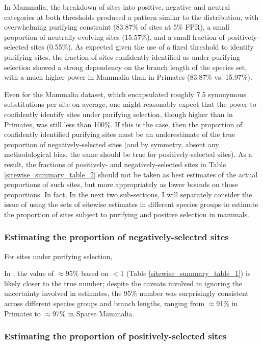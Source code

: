 In Mammalia, the breakdown of sites into positive, negative and
neutral categories at both \fpr thresholds produced a pattern similar
to the \omgml distribution, with overwhelming purifying constraint
(83.87\% of sites at 5\% FPR), a small proportion of
neutrally-evolving sites (15.57\%), and a small fraction of
positively-selected sites (0.55\%). As expected given the use of a
fixed \slrt threshold to identify purifying sites, the fraction of
sites confidently identified as under purifying selection showed a
strong dependency on the branch length of the species set, with a much
higher power in Mammalia than in Primates (83.87\% vs. 15.97\%).

Even for the Mammalia dataset, which encapsulated roughly 7.5
synonymous substitutions per site on average, one might reasonably
expect that the power to confidently identify sites under purifying
selection, though higher than in Primates, was still less than
100\%. If this is the case, then the proportion of confidently
identified purifying sites must be an underestimate of the true
proportion of negatively-selected sites (and by symmetry, absent any
methodological bias, the same should be true for positively-selected
sites). As a result, the fractions of positively- and
negatively-selected sites in Table \ref{sitewise_summary_table_2}
should not be taken as best estimates of the actual proportions of
such sites, but more appropriately as lower bounds on those
proportions. In fact, In the next two sub-sections, I will separately consider
the issue of using the sets of sitewise estimates in different species
groups to estimate the proportion of sites subject to purifying and
positive selection in mammals.

\subsubsection{Estimating the proportion of negatively-selected sites}

For sites under purifying selection, 

In , the value of $\approx$95\% based on \omgml$<1$ (Table
\ref{sitewise_summary_table_1}) is likely closer to the true number;
despite the caveats involved in ignoring the uncertainty involved in
\omgml estimates, the 95\% number was surprisingly consistent across
different species groups and branch lengths, ranging from
$\approx$91\% in Primates to $\approx$97\% in Sparse Mammalia.

\subsubsection{Estimating the proportion of positively-selected sites}

